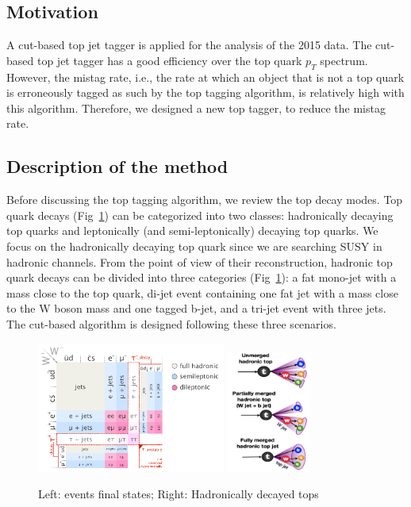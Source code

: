 \subsection{Motivation}
A cut-based top jet tagger is applied for the analysis of the 2015 data\cite{CMS-PAS-SUS-16-030}. The cut-based top jet tagger has a good efficiency over the top quark $p_{T}$ spectrum. However, the mistag rate, i.e., the rate at which an object that is not a top quark is erroneously tagged as such by the top tagging algorithm, is relatively high with this algorithm. Therefore, we designed a new top tagger, to reduce the mistag rate. 

\subsection{Description of the method}
\label{sec:toptagger}

Before discussing the top tagging algorithm, we review the top decay modes. Top quark decays (Fig~\ref{fig:c4twdecaymod}) can be categorized into two classes: hadronically decaying top quarks and leptonically (and semi-leptonically) decaying top quarks. We focus on the hadronically decaying top quark since we are searching SUSY in hadronic channels. From the point of view of their reconstruction, hadronic top quark decays can be divided into three categories (Fig~\ref{fig:c4twdecaymod}): a fat mono-jet with a mass close to the top quark, di-jet event containing one fat jet with a mass close to the W boson mass and one tagged b-jet, and a tri-jet event with three jets. The cut-based algorithm is designed following these three scenarios. 

\begin{figure}[htbp]
 \begin{center}
  \includegraphics[width=0.55\textwidth]{figures/c4/c4_top_w_decaymod.png}
  \includegraphics[width=0.25\textwidth]{figures/c4/c4_tagger_hadtopdecay.png}
 \end{center}
 \caption{Left: \ttbar events final states; Right: Hadronically decayed tops}
 \label{fig:c4twdecaymod}
\end{figure}

